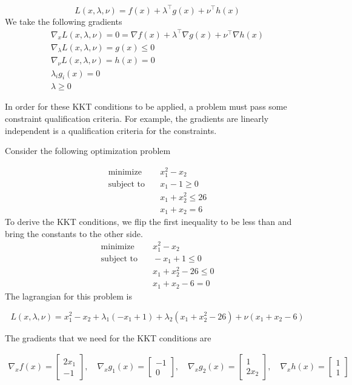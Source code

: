 \begin{equation}
    L (x, \lambda, \nu) = f(x) + \lambda^\top g(x) + \nu^\top h(x)
\end{equation}
We take the following gradients
\begin{gather}
    \nabla_x L(x, \lambda, \nu) = 0 = \nabla f(x) + \lambda^\top \nabla g(x) + \nu^\top \nabla h(x) \\
    \nabla_\lambda L(x, \lambda, \nu) = g(x) \leq 0 \\
    \nabla_\nu L(x, \lambda, \nu) = h(x) = 0 \\ 
    \lambda_i g_i(x) = 0 \\
    \lambda \geq 0 
\end{gather}

In order for these KKT conditions to be applied, a problem must pass some constraint qualification criteria.
For example, the gradients are linearly independent is a qualification criteria for the constraints.

Consider the following optimization problem

\begin{align}
  \text{minimize} & \quad x_1^2 - x_2 \\
  \text{subject to} & \quad x_1 - 1 \geq 0 \\
  & \quad x_1 + x_2^2 \leq 26 \\
  & \quad x_1 + x_2 = 6
\end{align}
To derive the KKT conditions, we flip the first inequality to be less than and bring the constants to the other side.
\begin{align}
    \text{minimize} & \quad x_1^2 - x_2 \\
    \text{subject to} & \quad -x_1 + 1 \leq 0 \\
    & \quad x_1 + x_2^2 -26 \leq 0 \\
    & \quad x_1 + x_2 -6 = 0
\end{align}
The lagrangian for this problem is 

\begin{equation}
    L(x, \lambda, \nu) = x_1^2 - x_2 + \lambda_1 (-x_1 + 1) + \lambda_2 (x_1 + x_2^2 - 26) + \nu(x_1 + x_2 - 6)
\end{equation}

The gradients that we need for the KKT conditions are 

\begin{align}
    \nabla_x f(x) = 
  \begin{bmatrix}
     2x_1 \\ -1
  \end{bmatrix},
  \quad
  \nabla_x g_1(x) = 
  \begin{bmatrix}
    -1 \\ 0
  \end{bmatrix},
  \quad
  \nabla_x g_2(x) = 
  \begin{bmatrix}
    1 \\ 2x_2
  \end{bmatrix},
  \quad
  \nabla_x h(x) = 
  \begin{bmatrix}
    1 \\ 1
  \end{bmatrix}
\end{align}

